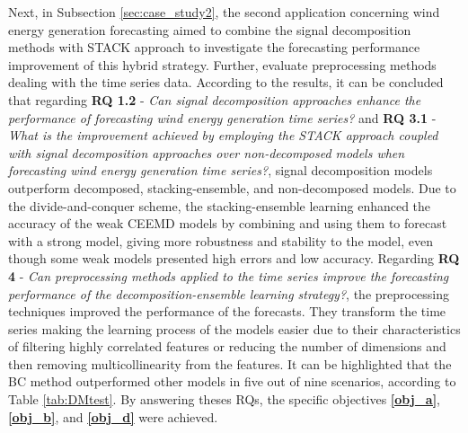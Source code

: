Next, in Subsection \ref{sec:case_study2}, the second application concerning wind energy generation forecasting aimed to combine the signal decomposition methods with \ac{STACK} approach to investigate the forecasting performance improvement of this hybrid strategy. Further, evaluate preprocessing methods dealing with the time series data. According to the results, it can be concluded that regarding \textbf{RQ 1.2} - \textit{Can signal decomposition approaches enhance the performance of forecasting wind energy generation time series?} and \textbf{RQ 3.1} - \textit{What is the improvement achieved by employing the \ac{STACK} approach coupled with signal decomposition approaches over non-decomposed models when forecasting wind energy generation time series?}, signal decomposition models outperform decomposed, stacking-ensemble, and non-decomposed models. Due to the divide-and-conquer scheme, the stacking-ensemble learning enhanced the accuracy of the weak \ac{CEEMD} models by combining and using them to forecast with a strong model, giving more robustness and stability to the model, even though some weak models presented high errors and low accuracy. Regarding \textbf{RQ 4} - \textit{Can preprocessing methods applied to the time series improve the forecasting performance of the decomposition-ensemble learning strategy?}, the preprocessing techniques improved the performance of the forecasts. They transform the time series making the learning process of the models easier due to their characteristics of filtering highly correlated features or reducing the number of dimensions and then removing multicollinearity from the features. It can be highlighted that the \ac{BC} method outperformed other models in five out of nine scenarios, according to Table \ref{tab:DMtest}. By answering theses \ac{RQ}s, the specific objectives \textbf{\ref{obj_a}}, \textbf{\ref{obj_b}}, and \textbf{\ref{obj_d}} were achieved.

